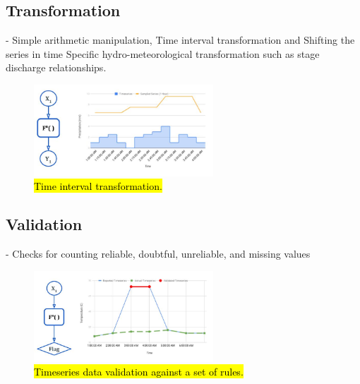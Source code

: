 \subsection{Transformation}- Simple arithmetic manipulation, Time interval transformation and Shifting the series in time Specific hydro-meteorological transformation such as stage discharge relationships.
\begin{figure}[htp]
    \centering
    \includegraphics[width=0.6\textwidth]{method/data_preprocess/transformation.jpg}
    \caption{\hl{Time interval transformation.}}
    \label{fi:transformation}
\end{figure}

\subsection{Validation}- Checks for counting reliable, doubtful, unreliable, and missing values
\begin{figure}[htp]
    \centering
    \includegraphics[width=0.6\textwidth]{method/data_preprocess/validation.jpg}
    \caption{\hl{Timeseries data validation against a set of rules.}}
    \label{fi:validation}
\end{figure}


